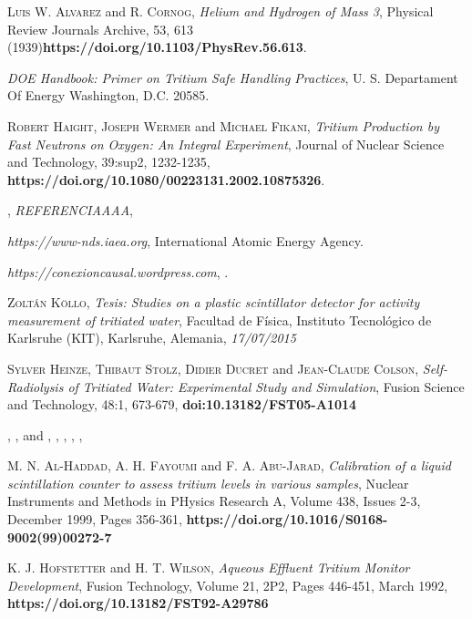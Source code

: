 \begin{thebibliography}{100}
 \textsc{Luis W. Alvarez} and \textsc{R. Cornog},  
\textit{Helium and Hydrogen of Mass 3}, Physical Review Journals Archive, 53, 613 (1939)\textbf{https://doi.org/10.1103/PhysRev.56.613}.

\textit{DOE Handbook: Primer on Tritium Safe Handling Practices}, U. S. Departament Of Energy Washington, D.C. 20585.

 \textsc{Robert Haight}, \textsc{Joseph Wermer} and \textsc{Michael Fikani},
\textit{Tritium Production by Fast Neutrons on Oxygen: An Integral Experiment}, Journal of Nuclear Science and Technology, 39:sup2, 1232-1235, \textbf{https://doi.org/10.1080/00223131.2002.10875326}. 

 \textsc{},
\textit{REFERENCIAAAA}, \textbf{}

\textit{https://www-nds.iaea.org}, International Atomic Energy Agency.

\textit{https://conexioncausal.wordpress.com}, .

 \textsc{Zoltán Köllo},
\textit{Tesis: Studies on a plastic scintillator detector for activity measurement of tritiated water}, Facultad de Física, Instituto Tecnológico de Karlsruhe (KIT), Karlsruhe, Alemania, \textit{17/07/2015}

 \textsc{Sylver Heinze}, \textsc{Thibaut Stolz}, \textsc{Didier Ducret} and \textsc{Jean-Claude Colson},
\textit{Self-Radiolysis of Tritiated Water: Experimental Study and Simulation}, Fusion Science and Technology, 48:1, 673-679, \textbf{doi:10.13182/FST05-A1014}

 \textsc{}, \textsc{}, \textsc{} and \textsc{},
\textit{}, , , , \textbf{}

 \textsc{M. N. Al-Haddad}, \textsc{A. H. Fayoumi} and \textsc{F. A. Abu-Jarad},
\textit{Calibration of a liquid scintillation counter to assess tritium levels in various samples}, Nuclear Instruments and Methods in PHysics Research A, Volume 438, Issues 2-3, December 1999, Pages 356-361, \textbf{https://doi.org/10.1016/S0168-9002(99)00272-7}

 \textsc{K. J. Hofstetter} and \textsc{H. T. Wilson},
\textit{Aqueous Effluent Tritium Monitor Development}, Fusion Technology, Volume 21, 2P2, Pages 446-451, March 1992, \textbf{https://doi.org/10.13182/FST92-A29786}


\end{thebibliography}
